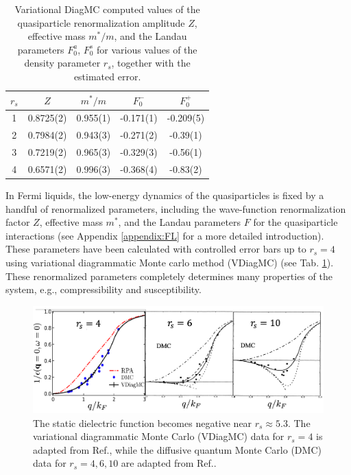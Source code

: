 \documentclass[reprint,amsmath,amssymb,aps,prb]{revtex4-1}
\begin{document}
\begin{table}
    \begin{center}
        \begin{tabular}{|c|c|c|c|c|}
            \hline
            $r_s$ & $Z$       & $m^*/m$  & $F_0^-$   & $F_0^+$   \\
            \hline
            1     & 0.8725(2) & 0.955(1) & -0.171(1) & -0.209(5) \\
            \hline
            2     & 0.7984(2) & 0.943(3) & -0.271(2) & -0.39(1)  \\
            \hline
            3     & 0.7219(2) & 0.965(3) & -0.329(3) & -0.56(1)  \\
            \hline
            4     & 0.6571(2) & 0.996(3) & -0.368(4) & -0.83(2)  \\
            \hline
        \end{tabular}
    \end{center}
    \caption{
        Variational DiagMC computed values of the quasiparticle renormalization amplitude
        $Z$, effective mass $m^*/m$, and the Landau parameters $F_0^a$,
        $F_0^s$ for various values of the density parameter $r_s$, together
        with the estimated error.
    }
    \label{tab1}
\end{table}

In Fermi liquids, the low-energy dynamics of the quasiparticles is fixed by a handful of renormalized parameters, including the wave-function renormalization factor $Z$, effective mass $m^*$, and the Landau parameters $F$ for the quasiparticle interactions (see Appendix \ref{appendix:FL} for a more detailed introduction). These parameters have been calculated with controlled error bars up to $r_s=4$ using variational diagrammatic Monte carlo method (VDiagMC) (see Tab. \ref{tab1}). These renormalized parameters completely determines many properties of the system, e.g., compressibility and susceptibility.

\begin{figure}
    \centering
    \label{fig:epsilon}
    \includegraphics[width=\linewidth]{epsilon.png}
    \caption{The static dielectric function becomes negative near $r_s\approx 5.3$. The variational diagrammatic Monte Carlo (VDiagMC) data for $r_s=4$ is adapted from Ref., while the diffusive quantum Monte Carlo (DMC) data for $r_s=4, 6, 10$ are adapted from Ref..}
\end{figure}
\end{document}
